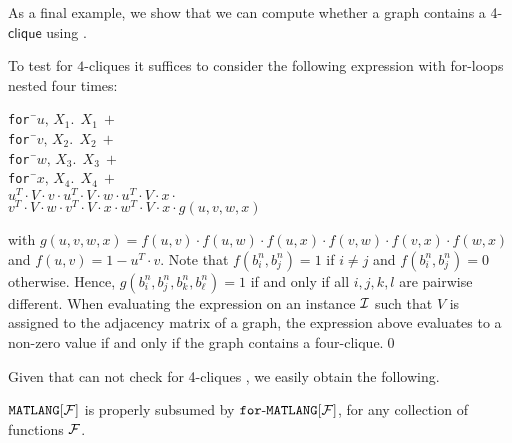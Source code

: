 As a final example, we show that we can compute whether a graph contains a 4-$\textsf{clique}$ using \langfor.
\begin{example}\label{ex:fourcliques}
To test for $4$-cliques it suffices to consider the following expression with for-loops nested four times:
\begin{center}
\parbox{0cm}{
\begin{tabbing}
\texttt{for\,}\=$u,\,X_1.\ \ X_1 \ + $\\
\> \texttt{for\,}\=$v,\,X_2.\ \ X_2 \ +$ \\
\>\>\texttt{for\,}\=$w,\,X_3.\ \ X_3 \ +$ \\
\>\>\>\texttt{for\,}\=$x,\,X_4.\ \ X_4 \ +$ \\
\>\>\>\>$u^T\cdot V\cdot v \cdot u^T\cdot V\cdot w\cdot u^T\cdot V\cdot x \cdot $\\
\>\>\>\>$v^T\cdot V\cdot w \cdot v^T\cdot V\cdot x\cdot w^T\cdot V\cdot x \cdot g(u,v,w,x)$
\end{tabbing}
}
\end{center}
with $g(u,v,w,x)=f(u,v)\cdot f(u,w)\cdot f(u,x)\cdot f(v,w)\cdot f(v,x)\cdot f(w,x)$ and
$f(u,v)=1-u^T\cdot v$. Note that $f(b_i^n,b_j^n)=1$ if $i\neq j$ and $f(b_i^n,b_j^n)=0$ otherwise.
Hence, $g(b_i^n,b_j^n,b_k^n,b_\ell^n)=1$ if and only if all $i,j,k,l$ are pairwise different.
When evaluating the expression on an instance $\mathcal{I}$ such that $V$ is assigned to the adjacency 
matrix of a graph, the expression above evaluates to a non-zero value if and only if the graph
contains a four-clique.\qed
\end{example}

Given that \lang can not check for 4-cliques \cite{matlang-journal}, we easily obtain the following.

\begin{proposition}
\label{cor-ml-fml}
$\texttt{MATLANG}[\mathcal{F}]$ is properly subsumed by $\texttt{for}\text{-}\texttt{MATLANG}[\mathcal{F}]$, for any collection of functions $\mathcal{F}$.
\end{proposition} 

%
%

